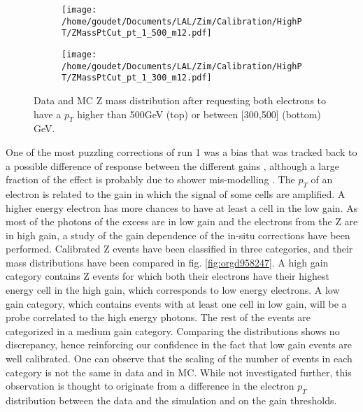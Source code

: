 \begin{figure}
\begin{subfigure}[t]{\linewidth}
\begin{center}
\texttt{[image: /home/goudet/Documents/LAL/Zim/Calibration/HighPT/ZMassPtCut\_pt\_1\_500\_m12.pdf]}
\end{center}
\end{subfigure}
\begin{subfigure}[t]{\linewidth}
\begin{center}
\texttt{[image: /home/goudet/Documents/LAL/Zim/Calibration/HighPT/ZMassPtCut\_pt\_1\_300\_m12.pdf]}
\end{center}
\end{subfigure}
\caption{\label{orgc498604}
Data and MC Z mass distribution after requesting both electrons to have a $p_T$ higher than 500GeV (top) or between [300,500] (bottom) GeV.}
\end{figure}

One of the most puzzling corrections of run 1 was a bias that was tracked back to a possible difference of response between the different gains \cite{CERN-THESIS-2015-193,ATL-COM-PHYS-2013-1655}, although a large fraction of the effect is probably due to shower mis-modelling \cite{ATL-COM-PHYS-2017-758}.
The $p_T$ of an electron is related to the gain in which the signal of some cells are amplified.
A higher energy electron has more chances to have at least a cell in the low gain.
As most of the photons of the excess are in low gain and the electrons from the Z are in high gain, a study of the gain dependence of the in-situ corrections have been performed.
Calibrated Z events have been classified in three categories, and their mass distributions have been compared in fig. \ref{fig:orgd958247}.
A high gain category contains Z events for which both their electrons have their highest energy cell in the high gain, which corresponds to low energy electrons.
A low gain category, which contains events with at least one cell in low gain, will be a probe correlated to the high energy photons.
The rest of the events are categorized in a medium gain category.
Comparing the distributions shows no discrepancy, hence reinforcing our confidence in the fact that low gain events are well calibrated.
One can observe that the scaling of the number of events in each category is not the same in data and in MC.
While not investigated further, this observation is thought to originate from a difference in the electron $p_T$ distribution between the data and the simulation and on the gain thresholds.

